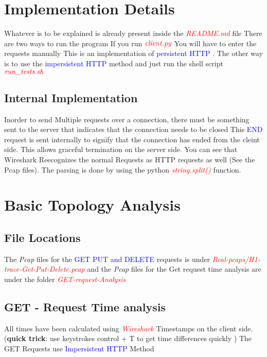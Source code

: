 \section{Implementation Details}
Whatever is to be explained is already present inside the \textit{\textcolor{red}{README.md}} file
There are two ways to run the program If you run $\textit{\textcolor{red}{client.py }} $You will have to enter the requests manually This is an implementation of \textcolor{blue}{persistent HTTP} . 
The other way is to use the \textcolor{blue}{impersistent HTTP} method
and just run the shell script $\textit{\textcolor{red}{run\_tests.sh }}$

\subsection{Internal Implementation}
Inorder to send Multiple requests over a connection, there must be something sent to the server that indicates that the connection needs to be closed
This \textcolor{blue}{END} request is sent internally to signify that the connection has ended from the cleint side. This allows graceful termination on
the server side. You can see that Wireshark Reecognizes the normal Requests as HTTP requests as well (See the Pcap files).
The parsing is done by using the python \textit{\textcolor{red}{string.split()}} function.

\section{Basic Topology Analysis}

\subsection{File Locations}
The \textit{Pcap} files for the \textcolor{blue}{GET PUT and DELETE} requests is under \textit{\textcolor{red}{Real-pcaps/H1-trace-Get-Put-Delete.pcap}}
and the \textit{Pcap} files for the Get request time analysis are under the folder \textit{\textcolor{red}{GET-request-Analysis}}
\subsection{GET - Request Time analysis}
All times have been calculated using \textit{\textcolor{red}{Wireshark}} Timestamps on the client side.
(\textbf{quick trick}: use keystrokes control + T to get time differences quickly )
The GET Requests use \textcolor{blue}{Impersistent HTTP} Method
\\

